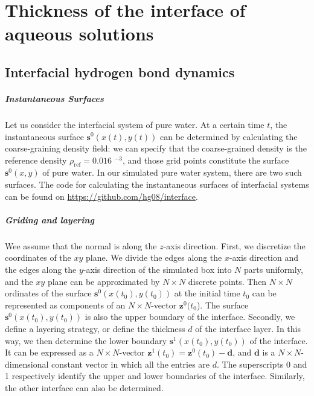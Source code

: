\chapter{Thickness of the interface of aqueous solutions} \label{thickness_interface}
\section{Interfacial hydrogen bond dynamics} \label{ihb_and_selection}
\paragraph{Instantaneous Surfaces}
Let us consider the interfacial system of pure water.  At a certain time $t$, the instantaneous surface ${\mathbf s}^0(x(t),y(t))$ can be determined by calculating 
the coarse-graining density field: we can specify that the coarse-grained density is the reference density $\rho_\text{ref} = 0.016 $ \A$^{-3}$,
and those grid points constitute the surface ${\mathbf s}^0(x,y)$ of pure water. In our simulated pure water system, there are two such surfaces.
The code for calculating the instantaneous surfaces of interfacial systems can be found on \url{https://github.com/hg08/interface}. 
\paragraph{Griding and layering}
Wee assume that the normal is along the $z$-axis direction. 
First, we  discretize the coordinates of the $xy$ plane. 
We divide the edges along the $x$-axis direction and the edges along the $y$-axis direction of the simulated box into $N$ parts uniformly, 
and the $xy$ plane can be approximated by $N\times N$ discrete points. 
Then $N\times N$ ordinates of the surface ${\mathbf s}^0(x(t_0),y(t_0))$ at the initial time $t_0$ can be represented as components of an $N\times N$-vector ${\mathbf z}^0(t_0$). 
The surface ${\mathbf s}^0(x(t_0),y(t_0))$ is also the upper boundary of the interface.
Secondly, we define a layering strategy, or define the thickness $d$ of the interface layer. 
In this way, we then determine the lower boundary ${\mathbf s}^1(x(t_0),y(t_0))$ of the interface. 
It can be expressed as a $N\times N$-vector ${\mathbf z}^1(t_0)={\mathbf z}^0(t_0)-{\mathbf d}$, and ${\mathbf d}$ is a $N\times N$-dimensional constant 
vector in which all the entries are $d$. The superscripts 0 and 1 respectively identify the upper and lower boundaries of the interface. 
Similarly, the other interface can also be determined.

